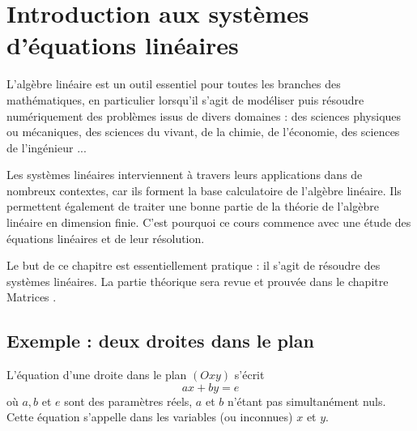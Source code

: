 \documentclass[class=report,crop=false]{standalone}
\begin{document}





\section{Introduction aux systèmes d'équations linéaires}


L'algèbre linéaire est un outil essentiel pour toutes les branches des mathématiques,
en particulier lorsqu'il s'agit de modéliser puis résoudre numériquement des problèmes issus de
divers domaines : des sciences physiques ou mécaniques, des sciences du vivant, de la chimie,
de l'économie, des sciences de l'ingénieur ...

Les systèmes linéaires interviennent 
à travers leurs applications dans de nombreux contextes,
car ils forment la base calculatoire
de l'algèbre linéaire. Ils permettent également de traiter
une bonne partie de la théorie de l'algèbre linéaire en dimension finie.
C'est pourquoi 
ce cours
commence avec une étude des équations
linéaires et de leur résolution.

Le but de ce chapitre est
essentiellement pratique : il s'agit de résoudre des systèmes linéaires.
La partie théorique sera revue et prouvée dans le chapitre \og Matrices \fg.

\subsection{Exemple : deux droites dans le plan}

L'équation d'une droite dans le plan $(Oxy)$ s'écrit
$$a x + b y = e$$
où $a, b$ et $e$ sont des paramètres réels, $a$ et $b$ n'étant pas simultanément nuls. Cette équation s'appelle
 dans les variables
(ou inconnues) $x$ et $y$.\\
\end{document}
